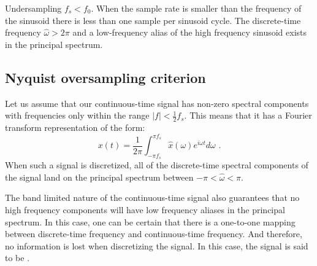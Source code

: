\begin{marginfigure}
\begin{center}
\end{center}
\caption{Undersampling $f_s < f_0$. When the sample rate is smaller than the frequency of the sinusoid there is less than one sample per sinusoid cycle. The discrete-time frequency $\hat{\omega}>2\pi$ and a low-frequency alias of the high frequency sinusoid exists in the principal spectrum.}
\label{fig:undersampling}
\end{marginfigure}

\subsection{Nyquist oversampling criterion}
Let us assume that our continuous-time signal has non-zero spectral components with frequencies only within the range $|f|<\frac{1}{2}f_s$. This means that it has a Fourier transform representation of the form:
\begin{equation}
    x(t) = \frac{1}{2\pi}\int_{-\pi f_s}^{\pi f_s} \hat{x}(\omega)
    e^{i\omega t}d\omega\,\,.
\end{equation}
When such a signal is discretized, all of the discrete-time spectral components of the signal land on the principal spectrum between $-\pi <\hat{\omega} < \pi$.

The band limited nature of the continuous-time signal also guarantees that no high frequency components will have low frequency aliases in the principal spectrum. In this case, one can be certain that there is a one-to-one mapping between discrete-time frequency and continuous-time frequency. And therefore, no information is lost when discretizing the signal. In this case, the signal is said to be \emph{}.

